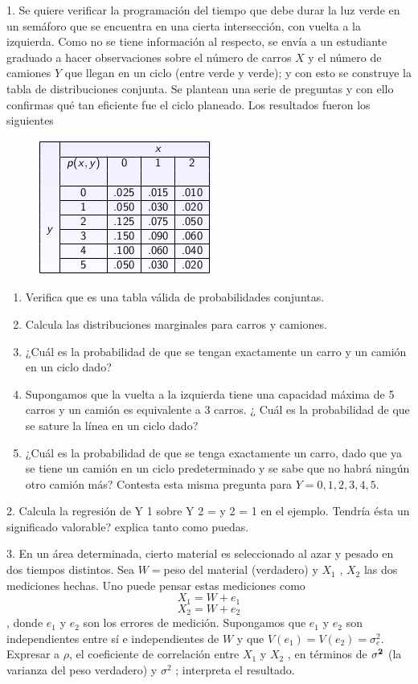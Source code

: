 \documentclass[11pt,letterpaper]{article}
\begin{document}
1. Se quiere verificar la programación del tiempo que debe durar la luz verde en un semáforo que se encuentra en una cierta intersección, con vuelta a la izquierda. Como no se tiene información al respecto, se envía a un estudiante graduado a hacer observaciones sobre el número de carros $X$
y el número de camiones $Y$ que llegan en un ciclo (entre verde y verde); y con esto se construye la tabla de distribuciones conjunta. Se plantean una serie de preguntas y con ello confirmas qué tan eficiente fue el ciclo planeado. Los resultados fueron los siguientes
\begin{figure}[H]
\centering
\includegraphics[scale=1]{semaforo.png}
\end{figure}
\begin{enumerate}
\item Verifica que es una tabla válida de probabilidades conjuntas.
\item Calcula las distribuciones marginales para carros y camiones.
\item ¿Cuál es la probabilidad de que se tengan exactamente un carro y un camión en un ciclo dado?
\item Supongamos que la vuelta a la izquierda tiene una capacidad máxima de 5 carros y un camión es equivalente a 3 carros. ¿ Cuál es la probabilidad de que se sature la línea en un ciclo dado?
\item  ¿Cuál es la probabilidad de que se tenga exactamente un carro, dado que ya se tiene un camión en un ciclo predeterminado y se sabe que no habrá ningún otro camión más? Contesta esta misma pregunta para $Y = 0, 1, 2, 3, 4, 5$.
\end{enumerate}

2. Calcula la regresión de Y 1 sobre Y 2 = y 2 = 1 en el ejemplo. Tendría ésta un significado valorable? explica tanto como puedas.

3. En un área determinada, cierto material es seleccionado al azar y pesado en dos tiempos distintos. Sea $W = $peso del material (verdadero) y $X_1$ , $X_2$ las dos mediciones hechas. Uno puede pensar estas mediciones como
$$X_1 =W + e_1$$
$$X_2 =W + e_2$$,
donde $e_1$ y $e_2$ son los errores de medición. Supongamos que $e_1$ y $e_2$ son independientes entre sí e independientes de $W$ y que $V(e_1)=V(e_2)=\sigma_e^2$. Expresar a $\rho$, el coeficiente de correlación entre $X_1$ y $X_2$ , en términos de $\bf\sigma^2$ (la varianza del peso verdadero) y $\sigma^2$ ; interpreta el resultado.
\end{document}
